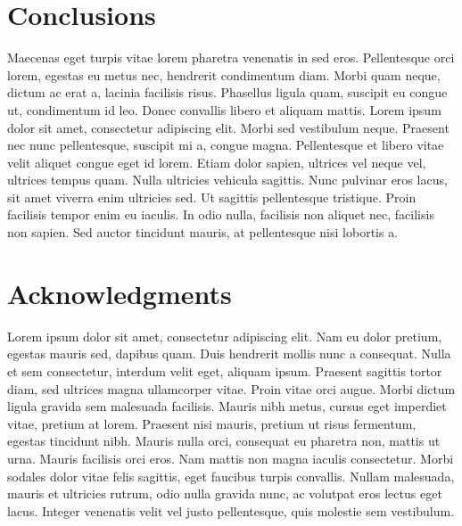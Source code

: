 \section{Conclusions}

Maecenas eget turpis vitae lorem pharetra venenatis in sed eros. Pellentesque
orci lorem, egestas eu metus nec, hendrerit condimentum diam. Morbi quam neque,
dictum ac erat a, lacinia facilisis risus. Phasellus ligula quam, suscipit eu
congue ut, condimentum id leo. Donec convallis libero et aliquam mattis. Lorem
ipsum dolor sit amet, consectetur adipiscing elit. Morbi sed vestibulum neque.
Praesent nec nunc pellentesque, suscipit mi a, congue magna. Pellentesque et
libero vitae velit aliquet congue eget id lorem. Etiam dolor sapien, ultrices
vel neque vel, ultrices tempus quam. Nulla ultricies vehicula sagittis. Nunc
pulvinar eros lacus, sit amet viverra enim ultricies sed. Ut sagittis
pellentesque tristique. Proin facilisis tempor enim eu iaculis. In odio nulla,
facilisis non aliquet nec, facilisis non sapien. Sed auctor tincidunt mauris,
at pellentesque nisi lobortis a.

\section{Acknowledgments}

Lorem ipsum dolor sit amet, consectetur adipiscing elit. Nam eu dolor pretium,
egestas mauris sed, dapibus quam. Duis hendrerit mollis nunc a consequat. Nulla
et sem consectetur, interdum velit eget, aliquam ipsum. Praesent sagittis
tortor diam, sed ultrices magna ullamcorper vitae. Proin vitae orci augue.
Morbi dictum ligula gravida sem malesuada facilisis. Mauris nibh metus, cursus
eget imperdiet vitae, pretium at lorem. Praesent nisi mauris, pretium ut risus
fermentum, egestas tincidunt nibh. Mauris nulla orci, consequat eu pharetra
non, mattis ut urna. Mauris facilisis orci eros. Nam mattis non magna iaculis
consectetur. Morbi sodales dolor vitae felis sagittis, eget faucibus turpis
convallis. Nullam malesuada, mauris et ultricies rutrum, odio nulla gravida
nunc, ac volutpat eros lectus eget lacus. Integer venenatis velit vel justo
pellentesque, quis molestie sem vestibulum.
